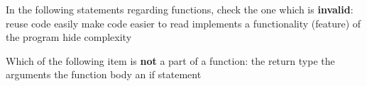 \begin{question}{
In the following statements regarding functions, check the one which is \textbf{invalid}:
}
  \false reuse code easily
  \false make code easier to read
  \true implements a functionality (feature) of the program
  \false hide complexity
\end{question}

\begin{question}{
Which of the following item is \textbf{not} a part of a function:
}
  \false the return type
  \false the arguments
  \false the function body
  \true an if statement
\end{question}
